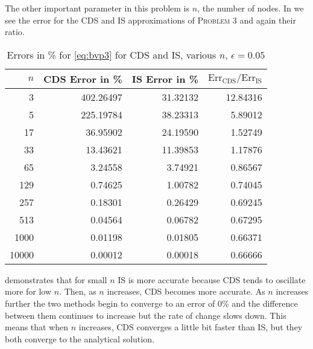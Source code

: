 \documentclass[../00_main.tex]{article}
\begin{document}
The other important parameter in this problem is $n$, the number of nodes. In
 we see the error for the CDS and IS approximations of
\textsc{Problem 3} and again their ratio. 
\begin{table}[h]
\centering
\begin{tabular}{| r | r | r | r |}\hline
    $n$  & CDS Error in \%   & IS Error in \% & $\text{Err}_{\text{CDS}}
    /\text{Err}_{\text{IS}}$   \\\hline\hline
    3      & 402.26497 & 31.32132 & 12.84316    \\\hline
    5      & 225.19784 & 38.23313 & 5.89012     \\\hline
    17     &  36.95902 & 24.19590 & 1.52749     \\\hline
    33     &  13.43621 & 11.39853 & 1.17876     \\\hline
    65     &   3.24558 &  3.74921 & 0.86567     \\\hline
    129    &   0.74625 &  1.00782 & 0.74045     \\\hline
    257    &   0.18301 &  0.26429 & 0.69245     \\\hline
    513    &   0.04564 &  0.06782 & 0.67295     \\\hline
    1000   &   0.01198 &  0.01805 & 0.66371     \\\hline
    10000  &   0.00012 &  0.00018 & 0.66666     \\\hline
\end{tabular}
    \vspace{15pt}
    \caption{Errors in \% for \eqref{eq:bvp3} for CDS and IS, various
    $n$, $\epsilon=0.05$}
    \label{tab:err_n}
\end{table}
 demonstrates that for small $n$ IS is more accurate because
CDS tends to oscillate more for low $n$. Then, as $n$ increases, CDS becomes 
more accurate. As $n$ increases further the two methods begin to converge to an 
error of 0\% and the difference between them continues to increase but the rate
of change slows down. This means that when $n$ increases, CDS converges a little
bit faster than IS, but they both converge to the analytical solution. 
\end{document}

